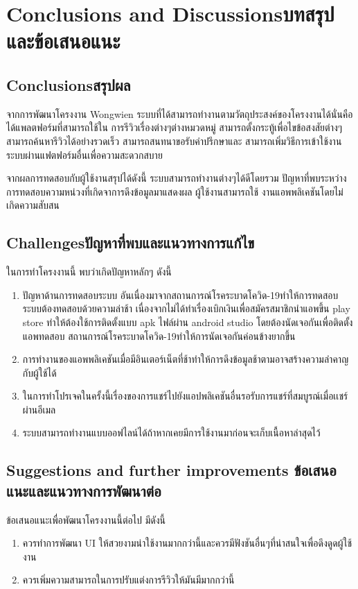 \chapter{\ifenglish Conclusions and Discussions\else บทสรุปและข้อเสนอแนะ\fi}

\section{\ifenglish Conclusions\else สรุปผล\fi}

จากการพัฒนาโครงงาน Wongwien ระบบที่ได้สามารถทำงานตามวัตถุประสงค์ของโครงงานได้นั่นคือได้แพลตฟอร์มที่สามารถใช้ใน
การรีวิวเรื่องต่างๆต่างหมวดหมู่ สามารถตั้งกระทู้เพื่อไขข้อสงสัยต่างๆ สามารถค้นหารีวิวได้อย่างรวดเร็ว สามารถสนทนาขอรับคำปรึกษาและ
สามารถเพิ่มวิธีการเข้าใช้งานระบบผ่านแฟตฟอร์มอื่นเพื่อความสะดวกสบาย

จากผลการทดสอบกับผู้ใช้งานสรุปได้ดังนี้
ระบบสามารถทำงานต่างๆได้ดีโดยรวม ปัญหาที่พบระหว่างการทดสอบความหน่วงที่เกิดจาการดึงข้อมูลมาแสดงผล ผู้ใช้งานสามารถใช้
งานแอพพลิเคชันโดยไม่เกิดความสับสน


\section{\ifenglish Challenges\else ปัญหาที่พบและแนวทางการแก้ไข\fi}

ในการทำโครงงานนี้ พบว่าเกิดปัญหาหลักๆ ดังนี้
\begin{enumerate}
    \item ปัญหาด้านการทดสอบระบบ อันเนื่องมาจากสถานการณ์โรคระบาดโควิด-19ทำให้การทดสอบระบบต้องทดสอบด้วยความล่าช้า
    เนื่องจากไม่ได้ทำเรื่องเบิกเงินเพื่อสมัครสมาชิกนำแอพขึ้น play store ทำให้ต้องใช้การติดตั้งแบบ apk ไฟล์ผ่าน android studio
    โดยต้องนัดเจอกันเพื่อติดตั้งแอพทดสอบ สถานการณ์โรคระบาดโควิด-19ทำให้การนัดเจอกันค่อนข้างยากขึ้น
    \item การทำงานของแอพพลิเคชันเมื่อมีอินเตอร์เน็ตที่ช้าทำให้การดึงข้อมูลช้าตามอาจสร้างความลำคาญกับผู้ใช้ได้
    \item ในการทำโปรเจคในครั้งนี้เรื่องของการแชร์ไปยังแอปพลิเคชันอื่นรอรับการแชร์ที่สมบูรณ์เมื่อเเชร์ผ่านอีเมล
    \item ระบบสามารถทำงานแบบออฟไลน์ได้ถ้าหากเคยมีการใช้งานมาก่อนจะเก็บเนื้อหาล่าสุดไว้
\end{enumerate}
\section{\ifenglish%
Suggestions and further improvements
\else%
ข้อเสนอแนะและแนวทางการพัฒนาต่อ
\fi
}

ข้อเสนอแนะเพื่อพัฒนาโครงงานนี้ต่อไป มีดังนี้
\begin{enumerate}
    \item ควรทำการพัฒนา UI ให้สวยงามน่าใช้งานมากกว่านี้และควรมีฟังชันอื่นๆที่น่าสนใจเพื่อดึงดูดผู้ใช้งาน
    \item ควรเพิ่มความสามารถในการปรับแต่งการรีวิวให้มันมีมากกว่านี้
\end{enumerate}
